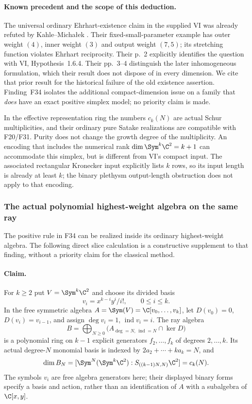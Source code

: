 \documentclass[11pt,a4paper]{article}
\newcommand{\fid}[1]{\textsf{#1}}\newcommand{\gate}[1]{\textsf{#1}}
\theoremstyle{named}\newtheorem{finding}{Finding}[section]
\theoremstyle{definition}\newtheorem{definition}[finding]{Definition}
\theoremstyle{remark}\newtheorem{remark}[finding]{Remark}
\begin{document}
\paragraph{Known precedent and the scope of this deduction.}
The universal ordinary Ehrhart-existence claim in the supplied VI
was already refuted by Kahle--Micha{\l}ek
\cite[Theorem~5 and Remark~6, p.~4]{KM}.
Their fixed-small-parameter example has outer weight $(4)$, inner
weight $(3)$ and output weight $(7,5)$; its stretching function
violates Ehrhart reciprocity. Their p.~2 explicitly identifies the
question with VI, Hypothesis~1.6.4. Their pp.~3--4 distinguish the
later inhomogeneous formulation, which their result does not
dispose of in every dimension.
We cite that prior result for the historical failure of the old
existence assertion. Finding~\fid{F34} isolates the additional
compact-dimension issue on a family that \emph{does} have an exact
positive simplex model; no priority claim is made.

In the effective representation ring the numbers $c_k(N)$ are actual
Schur multiplicities, and their ordinary pure Satake realizations
are compatible with \fid{F20}/\fid{F31}. Purity does not change the
growth degree of the multiplicity. An encoding that includes the
numerical rank $\dim\Sym^k\C^2=k+1$ can accommodate this simplex,
but is different from VI's compact input. The associated rectangular
Kronecker input explicitly lists $k$ rows, so its input length is
already at least $k$; the binary plethysm output-length obstruction
does not apply to that encoding.


\subsubsection{The actual polynomial highest-weight algebra on the same ray}
The positive rule in \fid{F34} can be realized inside its ordinary
highest-weight algebra. The following direct slice calculation is a
constructive supplement to that finding, without a priority claim for
the classical method.

\paragraph{Claim.}
For $k\ge2$ put $V=\Sym^k\C^2$ and choose its divided basis
\[
 v_i=x^{k-i}y^i/i!,\qquad 0\le i\le k.
\]
In the free symmetric algebra $A=\Sym(V)=\C[v_0,\ldots,v_k]$,
let $D(v_0)=0$, $D(v_i)=v_{i-1}$, and assign
$\deg v_i=1$, $\operatorname{ind}v_i=i$.
The ray algebra
\[
 B=\bigoplus_{N\ge0}
       \bigl(A_{\deg=N,\,\operatorname{ind}=N}\cap\ker D\bigr)
\]
is a polynomial ring on $k-1$ explicit generators $f_2,\ldots,f_k$
of degrees $2,\ldots,k$. Its actual degree-$N$ monomial basis is
indexed by $2a_2+\cdots+ka_k=N$, and
\[
 \dim B_N=[\Sym^N(\Sym^k\C^2):S_{((k-1)N,N)}\C^2]=c_k(N).
\]
The symbols $v_i$ are free algebra generators here; their displayed
binary forms specify a basis and action, rather than an identification
of $A$ with a subalgebra of $\C[x,y]$.
\end{document}

